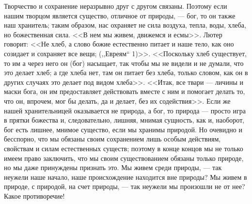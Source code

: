 \documentclass[12pt,oneside]{book}
\begin{document}
Творчество и сохранение неразрывно друг с другом связаны. Поэтому если нашим творцом является существо, отличное от природы, --- бог, то он также наш хранитель; таким образом, нас охраняет не сила воздуха, тепла, воды, хлеба, но божественная сила. <<В нем мы живем, движемся и есмы>>. Лютер говорит: <<Не хлеб, а слово божие естественно питает и наше тело, как оно созидает и сохраняет все вещи; (,,Евреям`` 1)>>. <<Поскольку хлеб существует, то им а через него он (бог) насыщает, так чтобы мы не видели и не думали, что это делает хлеб; а где хлеба нет, там он питает без хлеба, только словом, как он в других случаях это делает под видом хлеба>>. <<Итак, все твари --- личины и маски бога, он им предоставляет действовать вместе с ним и помогает делать то, что он, впрочем, мог бы делать, да и делает, без их содействия>>. Если же нашей хранительницей оказывается не природа, а бог, то природа --- просто игра в прятки божества и, следовательно, лишняя, мнимая сущность, как и, наоборот, бог есть лишнее, мнимое существо, если мы хранимы природой. Но очевидно и бесспорно, что мы обязаны своим сохранением лишь особым действиям, свойствам и силам естественных существ; поэтому в конце концов мы не только имеем право заключить, что мы своим существованием обязаны только природе, но мы даже принуждены признать это. Мы живем среди природы, --- так неужели наше начало, наше происхождение находится вне природы? Мы живем в природе, с природой, на счет природы, --- так неужели мы произошли не от нее? Какое противоречие!

\chapter{}
\end{document}
